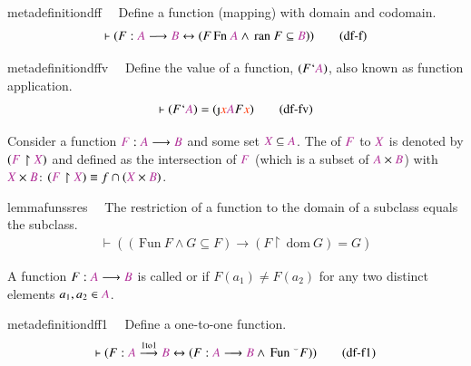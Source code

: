 \begin{restatable}{metadefinition}{dff}~~ Define a function (mapping) with domain and
codomain.    ~
\begin{align}
\vdash ( F : \mc{A} \longrightarrow \mc{B} \leftrightarrow ( F \,\mathrm{Fn}~
    \mc{A} \wedge \,\mathrm{ran}~ F \subseteq \mc{B} )
    )\label{eq:df-f}\tag{df-f}
\end{align}
\end{restatable}

\begin{restatable}{metadefinition}{dffv}~~ Define the value of a function, $( F `
\mc{A} )$, also known as function
       application.  
\begin{align}
\vdash ( F ` \mc{A} ) = ( \text{\riota} \msc{x} \mc{A} F \msc{x}
    )\label{eq:df-fv}\tag{df-fv}
\end{align}
\end{restatable}

\pn Consider a function \(\mc{F}:\mc{A}\longrightarrow \mc{B}\) and some set $\mc{X}\subseteq \mc{A}$.  The  of $\mc{F}$ to $\mc{X}$ 
is denoted by $(\mc{F}\restriction \mc{X})$ and defined as the intersection of $\mc{F}$ (which is a subset of $\mc{A}\times \mc{B}$) with $\mc{X}\times\mc{B}$:
\((\mc{F}\restriction \mc{X}) \equiv f\cap(\mc{X}\times \mc{B})\).  

\begin{restatable}{lemma}{funssres}~~ The restriction of a function to the
domain of a subclass equals the
       subclass.  ~
\begin{align}
\vdash ( ( \,\mathrm{Fun}~ F \wedge G \subseteq F ) \rightarrow ( F \restriction
    \,\mathrm{dom}~ G ) = G )\label{eq:funssres}\tag{funssres}
\end{align}
\end{restatable}

A function \(F:\mc{A}\longrightarrow \mc{B}\) is called  or  if $F(a_1)\ne F(a_2)$ for any two distinct elements $a_1,a_2\in \mc{A}$.  

\begin{restatable}{metadefinition}{dff1}~~ Define a one-to-one function. 
\begin{align}
\vdash ( F : \mc{A} \overset{\mathrm{1to1}}{\longrightarrow} \mc{B}
    \leftrightarrow ( F : \mc{A} \longrightarrow \mc{B} \wedge \,\mathrm{Fun}~
    {}^{\smallsmile} F ) )\label{eq:df-f1}\tag{df-f1}
\end{align}
\end{restatable}

